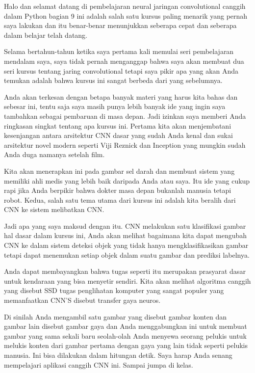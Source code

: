 Halo dan selamat datang di pembelajaran neural jaringan convolutional canggih dalam Python bagian 9
ini adalah salah satu kursus paling menarik yang pernah saya lakukan dan itu benar-benar menunjukkan seberapa cepat dan seberapa dalam belajar
telah datang.

Selama bertahun-tahun ketika saya pertama kali memulai seri pembelajaran mendalam saya, saya tidak pernah menganggap bahwa saya akan membuat dua seri
kursus tentang jaring convolutional tetapi saya pikir apa yang akan Anda temukan adalah bahwa kursus ini sangat berbeda
dari yang sebelumnya.

Anda akan terkesan dengan betapa banyak materi yang harus kita bahas dan sebesar ini, tentu saja saya masih
punya lebih banyak ide yang ingin saya tambahkan sebagai pembaruan di masa depan.
Jadi izinkan saya memberi Anda ringkasan singkat tentang apa kursus ini.
Pertama kita akan menjembatani kesenjangan antara arsitektur CNN dasar yang sudah Anda kenal dan sukai
arsitektur novel modern seperti Viji Reznick dan Inception yang mungkin sudah Anda duga namanya
setelah film.

Kita akan menerapkan ini pada gambar sel darah dan membuat sistem yang memiliki ahli medis yang lebih baik
daripada Anda atau saya.
Itu ide yang cukup rapi jika Anda berpikir bahwa dokter masa depan bukanlah manusia tetapi robot.
Kedua, salah satu tema utama dari kursus ini adalah kita beralih dari CNN ke sistem
melibatkan CNN.

Jadi apa yang saya maksud dengan itu.
CNN melakukan satu klasifikasi gambar hal dasar dalam kursus ini, Anda akan melihat bagaimana kita dapat mengubah CNN
ke dalam sistem deteksi objek yang tidak hanya mengklasifikasikan gambar tetapi dapat menemukan setiap objek dalam suatu gambar
dan prediksi labelnya.

Anda dapat membayangkan bahwa tugas seperti itu merupakan prasyarat dasar untuk kendaraan yang bisa menyetir sendiri.
Kita akan melihat algoritma canggih yang disebut SSD tugas penglihatan komputer yang sangat populer
yang memanfaatkan CNN'S disebut transfer gaya neuros.

Di sinilah Anda mengambil satu gambar yang disebut gambar konten dan gambar lain disebut gambar gaya
dan Anda menggabungkan ini untuk membuat gambar yang sama sekali baru seolah-olah Anda menyewa seorang pelukis untuk melukis konten
dari gambar pertama dengan gaya yang lain tidak seperti pelukis manusia.
Ini bisa dilakukan dalam hitungan detik.
Saya harap Anda senang mempelajari aplikasi canggih CNN ini.
Sampai jumpa di kelas.



